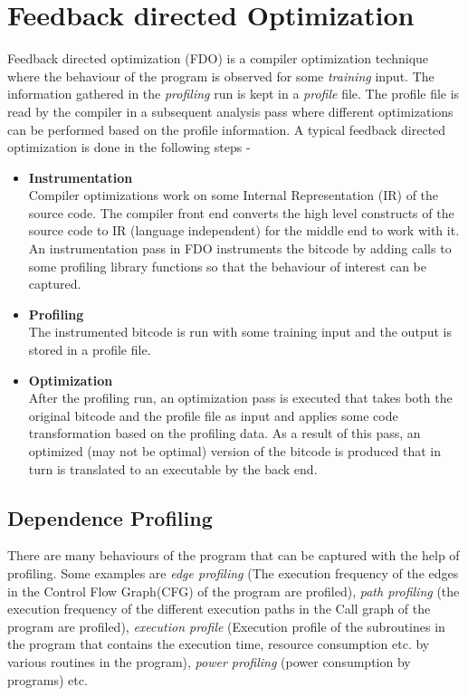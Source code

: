 \documentclass[10pt]{report}          %
\begin{document}
 
\section{Feedback directed Optimization}
\label{sec:fdo}

Feedback directed optimization (FDO) is a compiler optimization technique where the behaviour of the program is observed for some \textit{training} input.  The information gathered in the \textit{profiling} run is kept in a \textit{profile} file.  The profile file is read by the compiler in a subsequent analysis pass where different optimizations can be performed based on the profile information.  A typical feedback directed optimization is done in the following steps -

\begin{itemize}
\item \textbf{Instrumentation}\\

Compiler optimizations work on some Internal Representation (IR) of the source code.  The compiler front end converts the high level constructs of the source code to IR (language independent) for the middle end to work with it.  An instrumentation pass in FDO instruments the bitcode by adding calls to some profiling library functions so that the behaviour of interest can be captured.

\item \textbf{Profiling} \\

The instrumented bitcode is run with some training input and the output is stored in a profile file. 

\item \textbf{Optimization} \\

After the profiling run, an optimization pass is executed that takes both the original bitcode and the profile file as input and applies some code transformation based on the profiling data.  As a result of this pass, an optimized (may not be optimal) version of the bitcode is produced that in turn is translated to an executable by the back end.

\end{itemize} 

\subsection{Dependence Profiling}

There are many behaviours of the program that can be captured with the help of profiling.  Some examples are \textit{edge profiling} (The execution frequency of the edges in the Control Flow Graph(CFG) of the program are profiled), \textit{path profiling} (the execution frequency of the different execution paths in the Call graph of the program are profiled), \textit{execution profile}  (Execution profile of the subroutines in the program that contains the execution time, resource consumption etc. by various routines in the program), \textit{power profiling} (power consumption by programs) etc. \\
\end{document}
